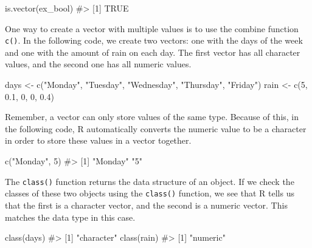 \documentclass[
  letterpaper,
]{latex/krantz}
\makeatletter
\newenvironment{Shaded}{\begin{snugshade}}{\end{snugshade}}
\newcommand{\CommentTok}[1]{\textcolor[rgb]{0.37,0.37,0.37}{#1}}
\newcommand{\DecValTok}[1]{\textcolor[rgb]{0.68,0.00,0.00}{#1}}
\newcommand{\FloatTok}[1]{\textcolor[rgb]{0.68,0.00,0.00}{#1}}
\newcommand{\FunctionTok}[1]{\textcolor[rgb]{0.28,0.35,0.67}{#1}}
\newcommand{\NormalTok}[1]{\textcolor[rgb]{0.00,0.23,0.31}{#1}}
\newcommand{\OtherTok}[1]{\textcolor[rgb]{0.00,0.23,0.31}{#1}}
\newcommand{\StringTok}[1]{\textcolor[rgb]{0.13,0.47,0.30}{#1}}
\newenvironment{kframe}{%
\medskip{}
\setlength{\fboxsep}{.8em}
 \def\at@end@of@kframe{}%
 \ifinner\ifhmode%
  \def\at@end@of@kframe{\end{minipage}}%
  \begin{minipage}{\columnwidth}%
 \fi\fi%
 \def\FrameCommand##1{\hskip\@totalleftmargin \hskip-\fboxsep
 \colorbox{shadecolor}{##1}\hskip-\fboxsep
     \hskip-\linewidth \hskip-\@totalleftmargin \hskip\columnwidth}%
 \MakeFramed {\advance\hsize-\width
   \@totalleftmargin\z@ \linewidth\hsize
   \@setminipage}}%
 {\par\unskip\endMakeFramed%
 \at@end@of@kframe}
\renewenvironment{Shaded}{\begin{kframe}}{\end{kframe}}
\makeatother
\begin{document}
\begin{Shaded}
\begin{Highlighting}[]
\FunctionTok{is.vector}\NormalTok{(ex\_bool)}
\CommentTok{\#\textgreater{} [1] TRUE}
\end{Highlighting}
\end{Shaded}

One way to create a vector with multiple values is
to use the combine function
\texttt{c()}. In the following code,
we create two vectors: one with the days of the week and one with the
amount of rain on each day. The first vector has all character values,
and the second one has all numeric values.

\begin{Shaded}
\begin{Highlighting}[]
\NormalTok{days }\OtherTok{\textless{}{-}} \FunctionTok{c}\NormalTok{(}\StringTok{"Monday"}\NormalTok{, }\StringTok{"Tuesday"}\NormalTok{, }\StringTok{"Wednesday"}\NormalTok{, }\StringTok{"Thursday"}\NormalTok{, }\StringTok{"Friday"}\NormalTok{)}
\NormalTok{rain }\OtherTok{\textless{}{-}} \FunctionTok{c}\NormalTok{(}\DecValTok{5}\NormalTok{, }\FloatTok{0.1}\NormalTok{, }\DecValTok{0}\NormalTok{, }\DecValTok{0}\NormalTok{, }\FloatTok{0.4}\NormalTok{)}
\end{Highlighting}
\end{Shaded}

Remember, a vector can only store values of the same type. Because of
this, in the following code, R automatically converts the numeric value
to be a character in order to store these values in a vector together.

\begin{Shaded}
\begin{Highlighting}[]
\FunctionTok{c}\NormalTok{(}\StringTok{"Monday"}\NormalTok{, }\DecValTok{5}\NormalTok{)}
\CommentTok{\#\textgreater{} [1] "Monday" "5"}
\end{Highlighting}
\end{Shaded}

The \texttt{class()}
function returns the data structure of an object. If we check the
classes of these two objects using the \texttt{class()} function, we see
that R tells us that the first is a character vector, and the second is
a numeric vector. This matches the data type in this case.

\begin{Shaded}
\begin{Highlighting}[]
\FunctionTok{class}\NormalTok{(days)}
\CommentTok{\#\textgreater{} [1] "character"}
\FunctionTok{class}\NormalTok{(rain)}
\CommentTok{\#\textgreater{} [1] "numeric"}
\end{Highlighting}
\end{Shaded}
\end{document}
